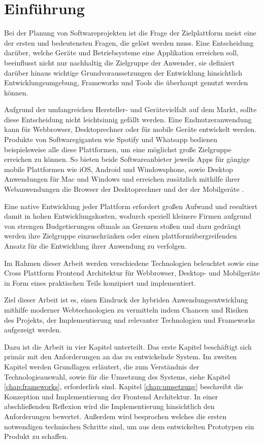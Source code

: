 
\chapter{Einführung}
\label{chap:introduction}

Bei der Planung von Softwareprojekten ist die Frage der Zielplattform meist eine der ersten und bedeutensten Fragen,
die gelöst werden muss. Eine Entscheidung darüber, welche Geräte und Betriebsysteme eine Applikation erreichen soll,
beeinflusst nicht nur nachhaltig die Zielgruppe der Anwender, sie definiert darüber hinaus wichtige Grundvoraussetzungen der Entwicklung hinsichtlich Entwicklungsumgebung, Frameworks und Tools die überhaupt genutzt werden können.

Aufgrund der umfangreichen Hersteller- und Gerätevielfalt auf dem Markt, sollte diese Entscheidung nicht leichtsinnig gefällt werden.
Eine Endnutzeranwendung kann für Webbrowser, Desktoprechner oder für mobile Geräte entwickelt werden.
Produkte von Softwaregiganten wie Spotify und Whatsapp bedienen beispielsweise alle diese Plattformen, um eine möglichst große Zielgruppe erreichen zu können.
So bieten beide Softwareanbieter jeweils Apps für gängige mobile Plattformen wie iOS, Android und Windowsphone,
sowie Desktop Anwendungen für Mac und Windows und erreichen zusätzlich mithilfe ihrer Webanwendungen die Browser der Desktoprechner
und der der Mobilgeräte \cite{Spoti93:online} \cite{Whats74:online} \cite{Whats6:online}.

Eine native Entwicklung jeder Plattform erfordert großen Aufwand und resultiert damit in hohen
Entwicklungskosten, wodurch speziell kleinere Firmen aufgrund von strengen Budgetierungen oftmals
an Grenzen stoßen und
dazu gedrängt werden ihre Zielgruppe einzuschränken oder einen plattformübergreifenden Ansatz für
die Entwicklung ihrer Anwendung zu verfolgen.

Im Rahmen dieser Arbeit werden verschiedene Technologien beleuchtet sowie eine
Cross Plattform Frontend Architektur für Webbrowser, Desktop- und Mobilgeräte in Form eines praktischen Teils
konzipiert und implementiert.

Ziel dieser Arbeit ist es, einen Eindruck der hybriden Anwendungsentwicklung mithilfe moderner
Webtechnologien zu vermitteln indem Chancen und Risiken des Projekts, der Implementierung und relevanter Technologien und Frameworks aufgezeigt werden.

\vspace{0.6cm}

\noindent
Dazu ist die Arbeit in vier Kapitel unterteilt. Das erste Kapitel beschäftigt sich primär mit den
Anforderungen an das zu entwickelnde System.
Im zweiten Kapitel werden Grundlagen erläutert, die zum Verständnis der Technologieauswahl,
sowie für die Umsetzung des Systems, siehe Kapitel \ref{chap:frameworks}, erforderlich sind.
Kapitel \ref{chap:umsetzung} beschreibt die Konzeption und Implementierung der Frontend Architektur.
In einer abschließenden Reflexion wird die Implementierung hinsichtlich den Anforderungen bewertet.
Außerdem wird besprochen welches die ersten notwendigen technischen Schritte sind, um aus dem entwickelten Prototypen ein Produkt zu schaffen.
